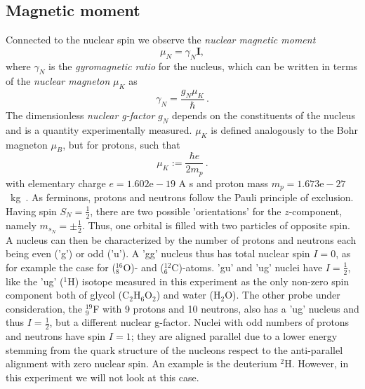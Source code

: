 \subsection{Magnetic moment}
Connected to the nuclear spin we observe the \emph{nuclear magnetic moment}
\begin{equation}
    \mu_N = \gamma_N \mathbf{I},
\end{equation}
where $\gamma_N$ is the \emph{gyromagnetic ratio} for the nucleus, which 
can be written in terms of the \emph{nuclear magneton} $\mu_K$
as
\begin{equation}
    \gamma_N = \frac{g_N \mu_K}{\hbar} \, .
\end{equation}
The dimensionless \emph{nuclear g-factor} $g_N$ depends on the constituents of the 
nucleus and is a quantity experimentally measured. $\mu_K$ is defined 
analogously to the Bohr magneton $\mu_B$, but for protons, such that 
\begin{equation}
    \mu_K := \frac{\hbar e}{2 m_p} \, .
\end{equation}
with elementary charge $e = 1.602\mathrm{e}-19$ A s 
and proton mass $m_p = 1.673\mathrm{e}-27$~kg~\cite{Demtroeder1}.
As ferminons, protons and neutrons follow the Pauli principle of exclusion. 
Having spin $S_N = \frac{1}{2}$, there are two possible 'orientations' for 
the $z$-component, namely $m_{s_N} = \pm \frac{1}{2}$. Thus, one orbital 
is filled with two particles of opposite spin. A nucleus can then be 
characterized by the number of protons and neutrons each being 
even ('g') or odd ('u'). A 'gg' nucleus thus has total nuclear spin $I = 0$, 
as for example the case for ($_8^{16}$O)- and ($_6^{12}$C)-atoms. 
'gu' and 'ug' nuclei have $I = \frac{1}{2}$, like the 'ug' ($^1$H) isotope 
measured in this experiment as the only non-zero spin component both of 
glycol (C$_2$H$_6$O$_2$) and water (H$_2$O). The other probe under consideration, 
the $_9^{19}$F with 9 protons and 10 neutrons, 
also has a 'ug' nucleus and thus $I = \frac{1}{2}$, but a different nuclear g-factor. 
Nuclei with odd numbers of 
protons and neutrons have spin $I = 1$; they are aligned parallel due to a lower 
energy stemming from the quark structure of the nucleons respect to the anti-parallel 
alignment with zero nuclear spin. An example is the deuterium $^2$H. However, in this 
experiment we will not look at this case. 

